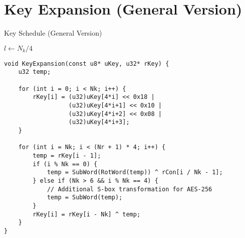 \newpage
\section{Key Expansion (General Version)}
\begin{algorithm}[H]
	\caption{Key Schedule (General Version)}
	
	\BlankLine
	$l\gets N_k/4$
\end{algorithm}
\begin{lstlisting}[style=C, caption={Key Expansion (General ver.)},captionpos=t]
void KeyExpansion(const u8* uKey, u32* rKey) {
	u32 temp;
	
	for (int i = 0; i < Nk; i++) {
		rKey[i] = (u32)uKey[4*i] << 0x18 | 
				  (u32)uKey[4*i+1] << 0x10 | 
				  (u32)uKey[4*i+2] << 0x08 | 
				  (u32)uKey[4*i+3];
	}
	
	for (int i = Nk; i < (Nr + 1) * 4; i++) {
		temp = rKey[i - 1];
		if (i % Nk == 0) {
			temp = SubWord(RotWord(temp)) ^ rCon[i / Nk - 1];
		} else if (Nk > 6 && i % Nk == 4) {
			// Additional S-box transformation for AES-256
			temp = SubWord(temp);
		}
		rKey[i] = rKey[i - Nk] ^ temp;
	}
}
\end{lstlisting}

\newpage

